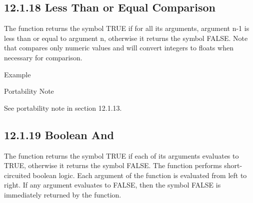 \documentclass[letterpaper,10pt,english]{sphinxmanual}
\begin{document}
\subsection{12.1.18 Less Than or Equal Comparison}
\label{\detokenize{actions:less-than-or-equal-comparison}}
The \sphinxstylestrong{\textless{}=} function returns the symbol TRUE if for all its arguments,
argument n-1 is less than or equal to argument n, otherwise it returns
the symbol FALSE. Note that \sphinxstylestrong{\textless{}=} compares only numeric values and will
convert integers to floats when necessary for comparison.


\begin{sphinxVerbatim}[commandchars=\\\{\}]
  
\end{sphinxVerbatim}

Example

\begin{sphinxVerbatim}[commandchars=\\\{\}]
    
    
\end{sphinxVerbatim}

Portability Note

See portability note in section 12.1.13.


\subsection{12.1.19 Boolean And}
\label{\detokenize{actions:boolean-and}}
The  function returns the symbol TRUE if each of its arguments
evaluates to TRUE, otherwise it returns the symbol FALSE. The 
function performs short-circuited boolean logic. Each argument of the
function is evaluated from left to right. If any argument evaluates to
FALSE, then the symbol FALSE is immediately returned by the function.

\end{document}
